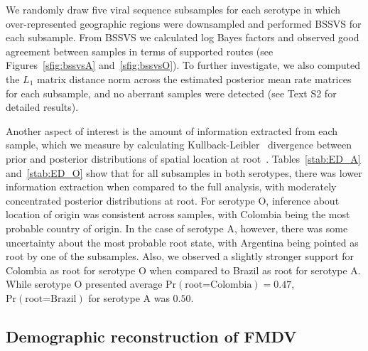 \documentclass[10pt]{article}
\begin{document}
We randomly draw five viral sequence subsamples for each serotype in which over-represented geographic regions were downsampled and performed BSSVS for each subsample.
From BSSVS we calculated log Bayes factors and observed good agreement between samples in terms of supported routes (see Figures~\ref{sfig:bssvsA} and~\ref{sfig:bssvsO}).
To further investigate, we also computed the $L_1$ matrix distance norm across the estimated posterior mean rate matrices for each subsample, and no aberrant samples were detected (see Text S2 for detailed results).

Another aspect of interest is the amount of information extracted from each sample, which we measure by calculating Kullback-Leibler~\cite{KL} divergence between prior and posterior distributions of spatial location at root~\cite{roots}.
Tables~\ref{stab:ED_A} and~\ref{stab:ED_O} show that for all subsamples in both serotypes, there was lower information extraction when compared to the full analysis, with moderately concentrated posterior distributions at root.
For serotype O, inference about location of origin was consistent across samples, with Colombia being the most probable country of origin.
In the case of serotype A, however, there was some uncertainty about the most probable root state, with Argentina being pointed as root by one of the subsamples.
Also, we observed a slightly stronger support for Colombia as root for serotype O when compared to Brazil as root for serotype A.
While serotype O presented average $\mbox{Pr}(\text{root=Colombia})=0.47$, $\mbox{Pr}(\text{root=Brazil})$ for serotype A was $0.50$.

\subsection*{Demographic reconstruction of FMDV}
\end{document}

